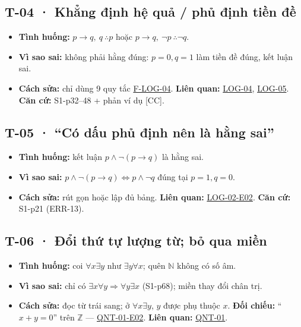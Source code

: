 \documentclass[
  10pt,
  twoside,openany]{book}
\providecommand{\tightlist}{%
  \setlength{\itemsep}{0pt}\setlength{\parskip}{0pt}}
\begin{document}
\hypertarget{T-04}{%
\subsection{T-04 · Khẳng định hệ quả / phủ định tiền đề}\label{T-04}}

\begin{itemize}
\tightlist
\item
  \textbf{Tình huống:} \(p\to q,\ q\ \therefore p\) hoặc
  \(p\to q,\ \neg p\ \therefore\neg q\).
\item
  \textbf{Vì sao sai:} không phải hằng đúng: \(p=0,q=1\) làm tiền đề
  đúng, kết luận sai.
\item
  \textbf{Cách sửa:} chỉ dùng 9 quy tắc
  \protect\hyperlink{F-LOG-04}{F-LOG-04}. \textbf{Liên quan:}
  \protect\hyperlink{LOG-04}{LOG-04},
  \protect\hyperlink{LOG-05}{LOG-05}. \textbf{Căn cứ:} S1-p32--48 + phản
  ví dụ {[}CC{]}.
\end{itemize}

\hypertarget{T-05}{%
\subsection{T-05 · ``Có dấu phủ định nên là hằng sai''}\label{T-05}}

\begin{itemize}
\tightlist
\item
  \textbf{Tình huống:} kết luận \(p\wedge\neg(p\to q)\) là hằng sai.
\item
  \textbf{Vì sao sai:}
  \(p\wedge\neg(p\to q)\Leftrightarrow p\wedge\neg q\) đúng tại
  \(p=1,q=0\).
\item
  \textbf{Cách sửa:} rút gọn hoặc lập đủ bảng. \textbf{Liên quan:}
  \protect\hyperlink{LOG-02-E02}{LOG-02-E02}. \textbf{Căn cứ:} S1-p21
  (ERR-13).
\end{itemize}

\hypertarget{T-06}{%
\subsection{T-06 · Đổi thứ tự lượng từ; bỏ qua miền}\label{T-06}}

\begin{itemize}
\tightlist
\item
  \textbf{Tình huống:} coi \(\forall x\exists y\) như
  \(\exists y\forall x\); quên \(\mathbb N\) không có số âm.
\item
  \textbf{Vì sao sai:} chỉ có
  \(\exists x\forall y\Rightarrow\forall y\exists x\) (S1-p68); miền
  thay đổi chân trị.
\item
  \textbf{Cách sửa:} đọc từ trái sang; ở \(\forall x\exists y\), \(y\)
  được phụ thuộc \(x\). \textbf{Đối chiếu:} ``\(x+y=0\)'' trên
  \(\mathbb Z\) --- \protect\hyperlink{QNT-01-E02}{QNT-01-E02}.
  \textbf{Liên quan:} \protect\hyperlink{QNT-01}{QNT-01}.
\end{itemize}
\end{document}
